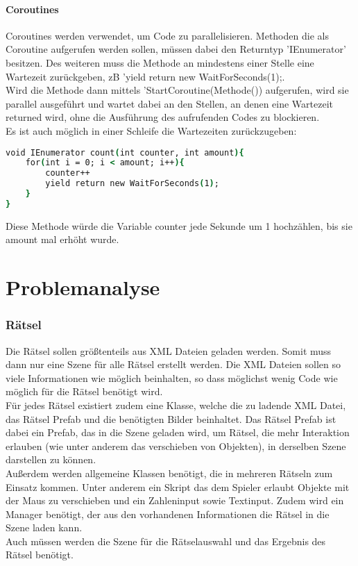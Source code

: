 \subsubsection{Coroutines}
\label{Grundlagen:Coroutines}
Coroutines werden verwendet, um Code zu parallelisieren. Methoden die als Coroutine aufgerufen werden sollen, müssen dabei den Returntyp 'IEnumerator' besitzen. Des weiteren muss die Methode an mindestens einer Stelle eine Wartezeit zurückgeben, zB 'yield return new WaitForSeconds(1);.\\
Wird die Methode dann mittels 'StartCoroutine(Methode()) aufgerufen, wird sie parallel ausgeführt und wartet dabei an den Stellen, an denen eine Wartezeit returned wird, ohne die Ausführung des aufrufenden Codes zu blockieren.\\
Es ist auch möglich in einer Schleife die Wartezeiten zurückzugeben:
\begin{lstlisting}[language=csh, caption={Laden einer Szene im Skript}]
void IEnumerator count(int counter, int amount){
	for(int i = 0; i < amount; i++){
		counter++
		yield return new WaitForSeconds(1);	
	}
}
\end{lstlisting}
Diese Methode würde die Variable counter jede Sekunde um 1 hochzählen, bis sie amount mal erhöht wurde.

\chapter{Problemanalyse}
\label{cha:problemanalyse}

\subsection{Rätsel}
Die Rätsel sollen größtenteils aus XML Dateien geladen werden. Somit muss dann nur eine Szene für alle Rätsel erstellt werden. Die XML Dateien sollen so viele Informationen wie möglich beinhalten, so dass möglichst wenig Code wie möglich für die Rätsel benötigt wird. \\
Für jedes Rätsel existiert zudem eine Klasse, welche die zu ladende XML Datei, das Rätsel Prefab und die benötigten Bilder beinhaltet. Das Rätsel Prefab ist dabei ein Prefab, das in die Szene geladen wird, um Rätsel, die mehr Interaktion erlauben (wie unter anderem das verschieben von Objekten), in derselben Szene darstellen zu können. \\
Außerdem werden allgemeine Klassen benötigt, die in mehreren Rätseln zum Einsatz kommen. Unter anderem ein Skript das dem Spieler erlaubt Objekte mit der Maus zu verschieben und ein Zahleninput sowie Textinput. Zudem wird ein Manager benötigt, der aus den vorhandenen Informationen die Rätsel in die Szene laden kann.\\
Auch müssen werden die Szene für die Rätselauswahl und das Ergebnis des Rätsel benötigt.


